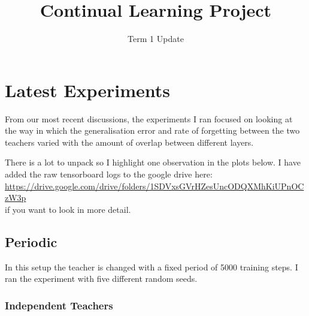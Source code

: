 \documentclass{article}
\begin{document}
	\title{Continual Learning Project}
	
	\author{Term 1 Update}
	
	\maketitle

\section{Latest Experiments}
    
From our most recent discussions, the experiments I ran focused on looking 
at the way in which the generalisation error and rate of forgetting between 
the two teachers varied with the amount of overlap between different layers. 

There is a lot to unpack so I highlight one observation in the plots below. 
I have added the raw tensorboard logs to the google drive here:\\ 

\href{https://drive.google.com/drive/folders/1SDVxsGVrHZesUncODQXMhKiUPnOCzW3p}{https://drive.google.com/drive/folders/1SDVxsGVrHZesUncODQXMhKiUPnOCzW3p}\\

\noindent if you want to look in more detail. 

\subsection{Periodic}

In this setup the teacher is changed with a fixed period of 5000 training steps. 
I ran the experiment with five different random seeds. 

\subsubsection{Independent Teachers}
\end{document}
